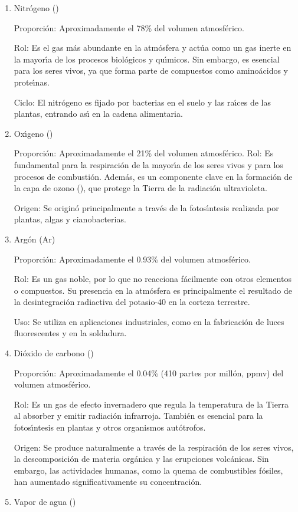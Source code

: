 \begin{enumerate}
\item  Nitr\'ogeno ()

Proporci\'on: Aproximadamente el 78\% del volumen atmosf\'erico.

Rol: Es el gas m\'as abundante en la atm\'osfera y act\'ua como un gas inerte en la mayor\'{\i}a de los procesos biol\'ogicos y qu\'{\i}micos. Sin embargo, es esencial para los seres vivos, ya que forma parte de compuestos como amino\'acidos y prote\'{\i}nas.

Ciclo: El nitr\'ogeno es fijado por bacterias en el suelo y las ra\'{\i}ces de las plantas, entrando as\'{\i} en la cadena alimentaria.
\item Ox\'{\i}geno ()

Proporci\'on: Aproximadamente el 21\% del volumen atmosf\'erico.
Rol: Es fundamental para la respiraci\'on de la mayor\'{\i}a de los seres vivos y para los procesos de combusti\'on. Adem\'as, es un componente clave en la formaci\'on de la capa de ozono (), que protege la Tierra de la radiaci\'on ultravioleta.

Origen: Se origin\'o principalmente a trav\'es de la fotos\'{\i}ntesis realizada por plantas, algas y cianobacterias.
\item Arg\'on (Ar)

Proporci\'on: Aproximadamente el 0.93\% del volumen atmosf\'erico.

Rol: Es un gas noble, por lo que no reacciona f\'acilmente con otros elementos o compuestos. Su presencia en la atm\'osfera es principalmente el resultado de la desintegraci\'on radiactiva del potasio-40 en la corteza terrestre.

Uso: Se utiliza en aplicaciones industriales, como en la fabricaci\'on de luces fluorescentes y en la soldadura.
\item Di\'oxido de carbono ()

Proporci\'on: Aproximadamente el 0.04\% (410 partes por mill\'on, ppmv) del volumen atmosf\'erico.

Rol: Es un gas de efecto invernadero que regula la temperatura de la Tierra al absorber y emitir radiaci\'on infrarroja. Tambi\'en es esencial para la fotos\'{\i}ntesis en plantas y otros organismos aut\'otrofos.

Origen: Se produce naturalmente a trav\'es de la respiraci\'on de los seres vivos, la descomposici\'on de materia org\'anica y las erupciones volc\'anicas. Sin embargo, las actividades humanas, como la quema de combustibles f\'osiles, han aumentado significativamente su concentraci\'on.
\item Vapor de agua ()


\end{enumerate}
